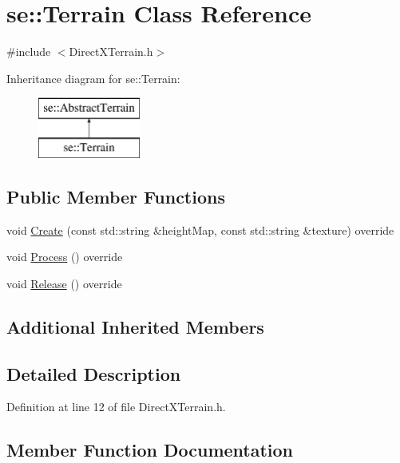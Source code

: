 \hypertarget{classse_1_1_terrain}{}\section{se\+:\+:Terrain Class Reference}
\label{classse_1_1_terrain}


{\ttfamily \#include $<$Direct\+X\+Terrain.\+h$>$}

Inheritance diagram for se\+:\+:Terrain\+:\begin{figure}[H]
\begin{center}
\leavevmode
\includegraphics[height=2.000000cm]{classse_1_1_terrain}
\end{center}
\end{figure}
\subsection*{Public Member Functions}
\begin{DoxyCompactItemize}
\item 
void \mbox{\hyperlink{classse_1_1_terrain_aa4faf6049af59a776a2464175e62ff08}{Create}} (const std\+::string \&height\+Map, const std\+::string \&texture) override
\item 
void \mbox{\hyperlink{classse_1_1_terrain_aa4eeb1886f46d2f33e1633b6f7c7345c}{Process}} () override
\item 
void \mbox{\hyperlink{classse_1_1_terrain_a61004e3426795d93190fe8d1f4159759}{Release}} () override
\end{DoxyCompactItemize}
\subsection*{Additional Inherited Members}


\subsection{Detailed Description}


Definition at line 12 of file Direct\+X\+Terrain.\+h.



\subsection{Member Function Documentation}
\mbox{\label{classse_1_1_terrain_aa4faf6049af59a776a2464175e62ff08}} 
